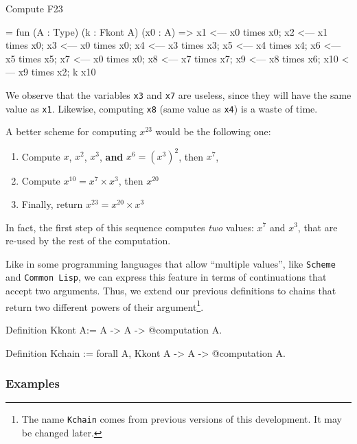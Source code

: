 \begin{Coqbad}
Compute F23
\end{Coqbad}

\begin{Coqanswer}
 = fun (A : Type) (k : Fkont A) (x0 : A) =>
       x1 <--- x0 times x0;
       x2 <--- x1 times x0;
       x3 <--- x0 times x0;
       x4 <--- x3 times x3;
       x5 <--- x4 times x4;
       x6 <--- x5 times x5;
       x7 <--- x0 times x0;
       x8 <--- x7 times x7; 
       x9 <--- x8 times x6; 
       x10 <--- x9 times x2; 
       k x10
\end{Coqanswer}

We observe that the variables \texttt{x3} and \texttt{x7} are 
useless, since
they will have the same value as \texttt{x1}. Likewise, computing
\texttt{x8} (same value as \texttt{x4}) is a waste of time.

 A better scheme for computing $x^{23}$ would be the following one:

 \begin{enumerate}
 \item Compute $x$, $x^2$, $x^3$, \textbf{and} $x^6 = {(x^3)}^2$, then  $x^7$,
 \item Compute $x^{10} = x^7 \times x^3$, then $x^{20}$
 \item Finally, return  $x^{23} = x^{20} \times x^3$
 \end{enumerate}

In fact, the first step of this sequence  computes \emph{two}
values: $x^7$ and $x^3$, that are re-used by the rest of the computation.

  Like in some programming languages
 that allow  ``multiple values'', like \texttt{Scheme} and \texttt{Common Lisp}, we can  express this feature 
 in terms of continuations that accept two arguments.
Thus, we extend our previous definitions to chains that return two 
different powers of their argument\footnote{The name \texttt{Kchain} comes from previous versions of this development. It may be changed later.}.



\begin{Coqsrc}
Definition Kkont A:=  A -> A -> @computation A.

Definition Kchain :=  forall A, Kkont A -> A -> @computation A.
\end{Coqsrc}

\subsubsection{Examples}

